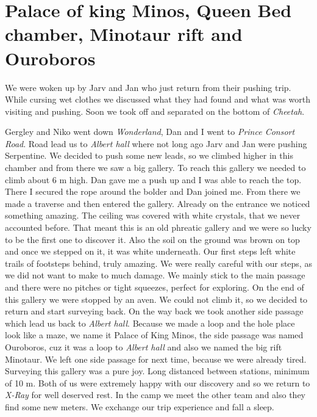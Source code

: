 \attrib{\izi}

\hypertarget{palace-of-king-minos-queen-bed-chamber-minotaur-rift-and-ouroboros}{%
\section{Palace of king Minos, Queen Bed chamber, Minotaur rift and
Ouroboros}\label{palace-of-king-minos-queen-bed-chamber-minotaur-rift-and-ouroboros}}

We were woken up by Jarv and Jan who just return from their pushing
trip. While cursing wet clothes we discussed what they had found and
what was worth visiting and pushing. Soon we took off and separated on
the bottom of \emph{Cheetah}.

Gergley and Niko went down \emph{Wonderland}, Dan and I went to
\emph{Prince Consort Road}. Road lead us to \emph{Albert hall} where not
long ago Jarv and Jan were pushing Serpentine. We decided to push some
new leads, so we climbed higher in this chamber and from there we saw a
big gallery. To reach this gallery we needed to climb about 6 m high.
Dan gave me a push up and I was able to reach the top. There I secured
the rope around the bolder and Dan joined me. From there we made a
traverse and then entered the gallery. Already on the entrance we
noticed something amazing. The ceiling was covered with white crystals,
that we never accounted before. That meant this is an old phreatic
gallery and we were so lucky to be the first one to discover it. Also
the soil on the ground was brown on top and once we stepped on it, it
was white underneath. Our first steps left white trails of footsteps
behind, truly amazing. We were really careful with our steps, as we did
not want to make to much damage. We mainly stick to the main passage and
there were no pitches or tight squeezes, perfect for exploring. On the
end of this gallery we were stopped by an aven. We could not climb it,
so we decided to return and start surveying back. On the way back we
took another side passage which lead us back to \emph{Albert hall}.
Because we made a loop and the hole place look like a maze, we name it
Palace of King Minos, the side passage was named Ouroboros, cuz it was a
loop to \emph{Albert hall} and also we named the big rift Minotaur. We
left one side passage for next time, because we were already tired.
Surveying this gallery was a pure joy. Long distanced between stations,
minimum of 10 m. Both of us were extremely happy with our discovery and
so we return to \emph{X-Ray} for well deserved rest. In the camp we meet
the other team and also they find some new meters. We exchange our trip
experience and fall a sleep.

